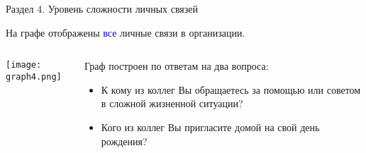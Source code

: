 \begin{frame}{Раздел 4. Уровень сложности личных связей}

На графе отображены \textcolor{blue}{все} личные связи в организации.

\begin{columns}[T] 
\begin{column}{0.8\textwidth} 
\centering
          \texttt{[image: graph4.png]}
\end{column}
\begin{column}{0.2\textwidth} 
\tiny
Граф построен по ответам на два вопроса:
\begin{itemize}
\item К кому из коллег Вы обращаетесь за помощью или советом в сложной жизненной ситуации?
\item Кого из коллег Вы пригласите домой на свой день рождения?
\end{itemize}
\end{column}
\end{columns}
\end{frame}


